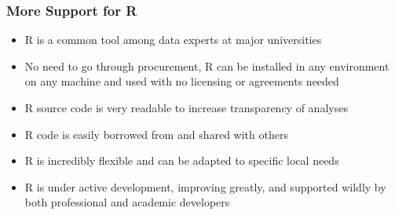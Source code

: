 \documentclass{beamer}
\begin{document}
\begin{frame}
\frametitle{More Support for R}
  \begin{itemize}
  \item R is a common tool among data experts at major universities
  \item No need to go through procurement, R can be installed in any environment on any machine and used with no licensing or agreements needed
  \item R source code is very readable to increase transparency of analyses
  \item R code is easily borrowed from and shared with others
  \item R is incredibly flexible and can be adapted to specific local needs
  \item R is under active development, improving greatly, and supported wildly by both professional and academic developers
  \end{itemize}
\end{frame}
\end{document}
